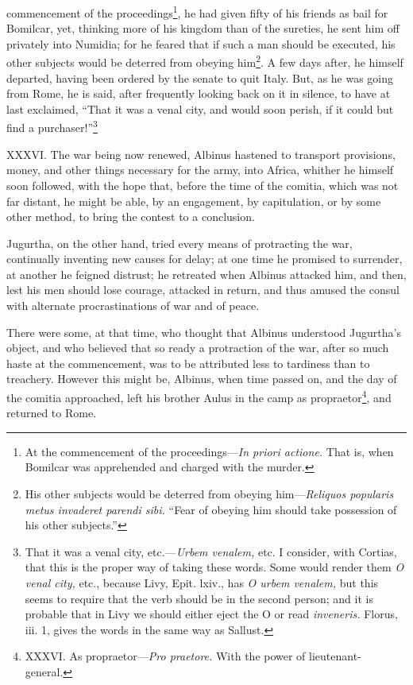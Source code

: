 commencement of the proceedings\footnote{At the commencement of the proceedings—\emph{In priori actione.}
That is, when Bomilcar was apprehended and charged with the murder.}, he had given fifty of his
friends as bail for Bomilcar, yet, thinking more of his kingdom than
of the sureties, he sent him off privately into Numidia; for he feared
that if such a man should be executed, his other subjects would be
deterred from obeying him\footnote{His other subjects would be deterred from obeying him—\emph{Reliquos
popularis metus invaderet parendi sibi.} ``Fear of obeying him should
take possession of his other subjects.''}. A few days after, he himself departed,
having been ordered by the senate to quit Italy. But, as he was going
from Rome, he is said, after frequently looking back on it in silence,
to have at last exclaimed, ``That it was a venal city, and would soon
perish, if it could but find a purchaser!''\footnote{That it was a venal city, etc.—\emph{Urbem venalem,} etc. I
consider, with Cortias, that this is the proper way of taking these
words. Some would render them \emph{O venal city,} etc., because Livy,
Epit. lxiv., has \emph{O urbem venalem,} but this seems to require that the
verb should be in the second person; and it is probable that in Livy
we should either eject the O or read \emph{inveneris.} Florus, iii. 1,
gives the words in the same way as Sallust.}

XXXVI. The war being now renewed, Albinus hastened to transport
provisions, money, and other things necessary for the army, into
Africa, whither he himself soon followed, with the hope that, before
the time of the comitia, which was not far distant, he might be able,
by an engagement, by capitulation, or by some other method, to bring
the contest to a conclusion.

Jugurtha, on the other hand, tried every means of protracting the war,
continually inventing new causes for delay; at one time he promised to
surrender, at another he feigned distrust; he retreated when Albinus
attacked him, and then, lest his men should lose courage, attacked in
return, and thus amused the consul with alternate procrastinations of
war and of peace.

There were some, at that time, who thought that Albinus understood
Jugurtha's object, and who believed that so ready a protraction of the
war, after so much haste at the commencement, was to be attributed
less to tardiness than to treachery. However this might be, Albinus,
when time passed on, and the day of the comitia approached, left his
brother Aulus in the camp as propraetor\footnote{XXXVI. As propraetor—\emph{Pro praetore.} With the power of
lieutenant-general.}, and returned to Rome.

